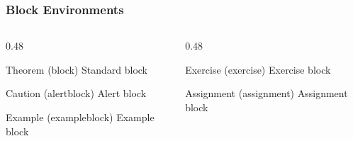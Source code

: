 \documentclass[aspectratio=169, 10pt, fleqn, hyperref={pdfpagelabels=false, bookmarks=false, hyperfootnotes=false}]{beamer}
\begin{document}
\begin{frame}[label=blocks]
  \frametitle{Block Environments}
  \begin{columns}[t]
    \begin{column}{0.48\textwidth}
      \begin{block}{Theorem (block)}
        Standard block
      \end{block}
      \begin{alertblock}{Caution (alertblock)}
        Alert block
      \end{alertblock}
      \begin{exampleblock}{Example (exampleblock)}
        Example block
      \end{exampleblock}
    \end{column}
    \begin{column}{0.48\textwidth}
      \begin{exercise}{Exercise (exercise)}
        Exercise block
      \end{exercise}
      \begin{assignment}{Assignment (assignment)}
        Assignment block
      \end{assignment}
    \end{column}
  \end{columns}
\end{frame}
\end{document}

